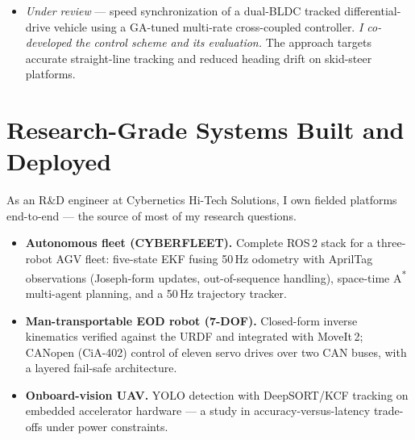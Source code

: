 \documentclass[10.5pt]{article}
\begin{document}
\begin{itemize}
    \textit{I co-developed the master--slave RS485 communication firmware and its timing analysis across
    eleven STM32 nodes}, validated on a 6-DOF manipulator ROV. A selective-feedback scheme keeps every node
    synchronized without saturating the half-duplex bus, enabling scalable actuator and sensor networks.
    \item \textit{Under review} --- speed synchronization of a dual-BLDC tracked differential-drive
    vehicle using a GA-tuned multi-rate cross-coupled controller. \textit{I co-developed the control scheme
    and its evaluation.} The approach targets accurate straight-line tracking and reduced heading drift on
    skid-steer platforms.
\end{itemize}

\section*{Research-Grade Systems Built and Deployed}
As an R\&D engineer at Cybernetics Hi-Tech Solutions, I own fielded platforms end-to-end --- the source of
most of my research questions.
\begin{itemize}
    \item \textbf{Autonomous fleet (CYBERFLEET).} Complete ROS\,2 stack for a three-robot AGV fleet:
    five-state EKF fusing 50\,Hz odometry with AprilTag observations (Joseph-form updates, out-of-sequence
    handling), space-time A\textsuperscript{*} multi-agent planning, and a 50\,Hz trajectory tracker.
    \item \textbf{Man-transportable EOD robot (7-DOF).} Closed-form inverse kinematics verified against the
    URDF and integrated with MoveIt\,2; CANopen (CiA-402) control of eleven servo drives over two CAN buses,
    with a layered fail-safe architecture.
    \item \textbf{Onboard-vision UAV.} YOLO detection with DeepSORT/KCF tracking on embedded accelerator
    hardware --- a study in accuracy-versus-latency trade-offs under power constraints.
\end{itemize}
\end{document}
